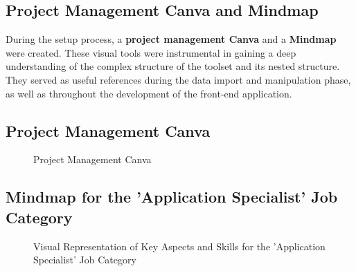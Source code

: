 \subsection{ Project Management Canva and Mindmap}

During the setup process, a {\color{limeGreen}\textbf{project management Canva}} and a {\color{limeGreen}\textbf{Mindmap}} were created. These visual tools were instrumental in gaining a deep  
understanding of the complex structure of the  toolset and its nested structure. 
They served as useful references during the data import and manipulation phase, as well as throughout the development of the front-end application.


\subsection{Project Management Canva}
\begin{figure}[H]
    \centering
    \caption{ Project Management Canva }
    \label{fig: Project-Management-Canva}
\end{figure}


\begin{landscape}
 \subsection*{Mindmap for the 'Application Specialist' Job Category}
\begin{figure}[!b]
    \centering
    \caption{Visual Representation of Key Aspects and Skills for the 'Application Specialist' Job Category}
    \label{fig:Application_Specialist_Job_Mindmap}
\end{figure}
\end{landscape}

